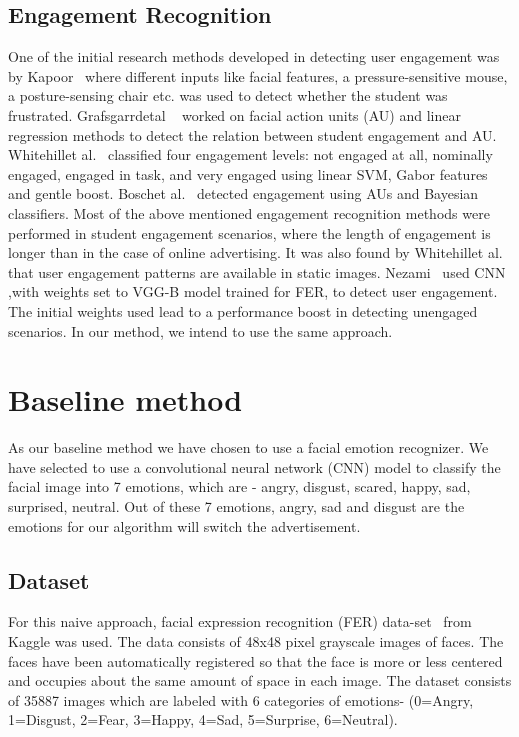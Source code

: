 \documentclass[10pt,twocolumn,letterpaper]{article}
\begin{document}
\subsection{Engagement Recognition}
One of the initial research methods developed in detecting user engagement was by Kapoor~\cite{Kapoor} where different inputs like facial features, a pressure-sensitive mouse, a posture-sensing chair etc. was used to detect whether the student was frustrated. Grafsgarrdetal ~\cite{MultimodalEngagement} worked on facial action units (AU) and linear regression methods to detect the relation between student engagement and AU. Whitehillet al.~\cite{6786307} classified four engagement levels: not engaged at all, nominally engaged, engaged in task, and very engaged using linear SVM, Gabor features and gentle boost. Boschet al.~\cite{Bosch} detected engagement using AUs and Bayesian classifiers. Most of the above mentioned engagement recognition methods were performed in student engagement scenarios, where the length of engagement is longer than in the case of online advertising. It was also found by Whitehillet al.~\cite{6786307}  that user engagement patterns are available in static images. Nezami~\cite{DBLP} used CNN ,with weights set to VGG-B model trained for FER, to detect user engagement. The initial weights used lead to a performance boost in detecting unengaged scenarios. In our method, we intend to use the same approach.

\section{Baseline method}\label{baselineMethod}

As our baseline method we have chosen to use a facial emotion recognizer. We have selected to use a convolutional neural network (CNN) model to classify the facial image into 7 emotions, which are - angry, disgust, scared, happy, sad, surprised, neutral. Out of these 7 emotions, angry, sad and disgust are the emotions for our algorithm will switch the advertisement.
\subsection{Dataset}

For this naive approach, facial expression recognition (FER) data-set~\cite{FER2013} from Kaggle was used. The data consists of 48x48 pixel grayscale images of faces. The faces have been automatically registered so that the face is more or less centered and occupies about the same amount of space in each image. The dataset consists of 35887 images which are labeled with 6 categories of emotions- (0=Angry, 1=Disgust, 2=Fear, 3=Happy, 4=Sad, 5=Surprise, 6=Neutral).
\end{document}
